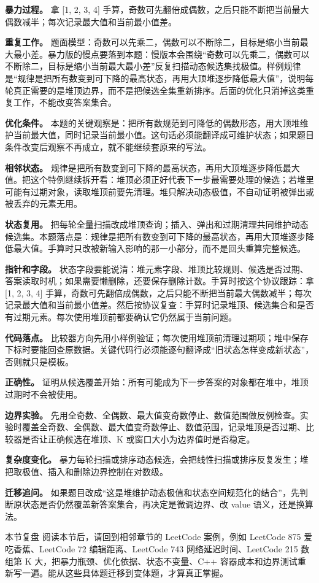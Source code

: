 \textbf{暴力过程。} 拿 [1, 2, 3, 4] 手算，奇数可先翻倍成偶数，之后只能不断把当前最大偶数减半；每次记录最大值和当前最小值差。

\textbf{重复工作。} 题面模型：奇数可以先乘二，偶数可以不断除二，目标是缩小当前最大最小差。暴力版的慢点要落到本题：慢版本会围绕“奇数可以先乘二，偶数可以不断除二，目标是缩小当前最大最小差”反复扫描动态候选集找极值。样例规律是“规律是把所有数变到可下降的最高状态，再用大顶堆逐步降低最大值”，说明每轮真正需要的是堆顶边界，而不是把候选全集重新排序。后面的优化只消掉这类重复工作，不能改变答案集合。

\textbf{优化条件。} 本题的关键观察是：把所有数规范到可降低的偶数形态，用大顶堆维护当前最大值，同时记录当前最小值。这句话必须能翻译成可维护状态；如果题目条件改变后观察不再成立，就不能继续套原来的写法。

\textbf{相邻状态。} 规律是把所有数变到可下降的最高状态，再用大顶堆逐步降低最大值。把这个特例继续拆开看：堆顶必须正好代表下一步最需要处理的候选；若堆里可能有过期对象，读取堆顶前要先清理。堆只解决动态极值，不自动证明被弹出或被丢弃的元素无用。

\textbf{状态复用。} 把每轮全量扫描改成堆顶查询；插入、弹出和过期清理共同维护动态候选集。本题落点是：规律是把所有数变到可下降的最高状态，再用大顶堆逐步降低最大值。手算时只改被新输入影响的那一小部分，而不是回头重算完整候选。

\textbf{指针和字段。} 状态字段要能说清：堆元素字段、堆顶比较规则、候选是否过期、答案读取时机；如果需要懒删除，还要保存删除计数。手算时按这个协议跟踪：拿 [1, 2, 3, 4] 手算，奇数可先翻倍成偶数，之后只能不断把当前最大偶数减半；每次记录最大值和当前最小值差。然后按协议复查：手算时记录堆顶、候选集合和是否有过期元素。每次使用堆顶前都要确认它仍然属于当前问题。

\textbf{代码落点。} 比较器方向先用小样例验证；每次使用堆顶前清理过期项；堆中保存下标时要能回查原数据。关键代码行必须能逐句翻译成“旧状态怎样变成新状态”，否则就只是模板。

\textbf{正确性。} 证明从候选覆盖开始：所有可能成为下一步答案的对象都在堆中，堆顶过期时不会被使用。

\textbf{边界实验。} 先用全奇数、全偶数、最大值变奇数停止、数值范围做反例检查。实验时覆盖全奇数、全偶数、最大值变奇数停止、数值范围，记录堆顶是否过期、比较器是否让正确候选在堆顶、K 或窗口大小为边界值时是否稳定。

\textbf{复杂度变化。} 暴力每轮扫描或排序动态候选，会把线性扫描或排序反复发生；堆把取极值、插入和删除边界控制在对数级。

\textbf{迁移追问。} 如果题目改成“这是堆维护动态极值和状态空间规范化的结合”，先判断原状态是否仍然覆盖新答案集合，再决定是微调边界、改 value 语义，还是换算法。

\begin{principlebox}{本节复盘}
阅读本节后，请回到相邻章节的 LeetCode 案例，例如 LeetCode 875 爱吃香蕉、LeetCode 72 编辑距离、LeetCode 743 网络延迟时间、LeetCode 215 数组第 K 大，把暴力瓶颈、优化依据、状态不变量、C++ 容器成本和边界测试重新写一遍。能从这些具体题迁移到变体题，才算真正掌握。
\end{principlebox}
